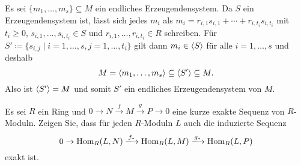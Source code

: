 \begin{solution}
  Es sei $\{m_1, \dotsc, m_s\} \subseteq M$ ein endliches Erzeugendensystem.
  Da $S$ ein Erzeugendensystem ist, lässt sich jedes $m_i$ als $m_i = r_{i,1} s_{i,1} + \dotsb + r_{i,t_i} s_{i,t_i}$ mit $t_i \geq 0$, $s_{i,1}, \dotsc, s_{i,t_i} \in S$ und $r_{i,1}, \dotsc, r_{i,t_i} \in R$ schreiben.
  Für $S' \coloneqq \{s_{i,j} \mid i = 1, \dotsc, s, j = 1, \dotsc, t_i\}$ gilt dann $m_i \in \left\langle S \right\rangle$ für alle $i = 1, \dotsc, s$ und deshalb
  \[
              M
    =         \left\langle m_1, \dotsc, m_s \right\rangle
    \subseteq \left\langle S' \right\rangle
    \subseteq M.
  \]
  Also ist $\left\langle S' \right\rangle = M$ und somit $S'$ ein endliches Erzeugendensystem von $M$.
\end{solution}


\begin{question}[subtitle = Linksexaktheit von $\Hom$]
  \label{question: Hom is left exact}
  Es sei $R$ ein Ring und $0 \to N \xrightarrow{f} M \xrightarrow{g} P \to 0$ eine kurze exakte Sequenz von $R$-Moduln.
  Zeigen Sie, dass für jeden $R$-Moduln $L$ auch die induzierte Sequenz
  \[
                          0
    \to                   \Hom_R(L,N)
    \xlongrightarrow{f_*} \Hom_R(L,M)
    \xlongrightarrow{g_*} \Hom_R(L,P)
  \]
  exakt ist.
\end{question}


